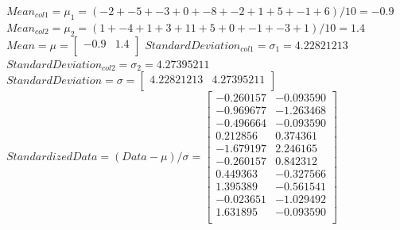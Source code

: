 \documentclass[12pt]{article}
\begin{document}
\begin{enumerate}
\begin{enumerate}
$Mean_{col1} = \mu_1 = (-2 + -5 + -3 + 0 + -8 + -2 + 1 + 5 + -1 + 6)/10 = -0.9$\newline
$Mean_{col2} = \mu_2 = (1 + -4 + 1 + 3 + 11 + 5 + 0 + -1 + -3 + 1)/10 = 1.4$\newline
$Mean = \mu = \begin{bmatrix}-0.9 & 1.4\\ \end{bmatrix}$\newline
$Standard Deviation_{col1} = \sigma_1 = 4.22821213$\newline
$Standard Deviation_{col2} = \sigma_2 = 4.27395211$\newline
$Standard Deviation = \sigma = \begin{bmatrix} 4.22821213 & 4.27395211\\ \end{bmatrix}$\newline
\hfill \break
$Standardized Data = (Data - \mu) / \sigma =
\begin{bmatrix}
-0.260157 & -0.093590\\
-0.969677 & -1.263468\\
-0.496664 & -0.093590\\
 0.212856 & 0.374361\\
-1.679197 & 2.246165\\
-0.260157 & 0.842312\\
 0.449363 & -0.327566\\
 1.395389 & -0.561541\\
-0.023651 & -1.029492\\
 1.631895 & -0.093590\\
\end{bmatrix} 
$


\end{enumerate}
\end{enumerate}
\end{document}
